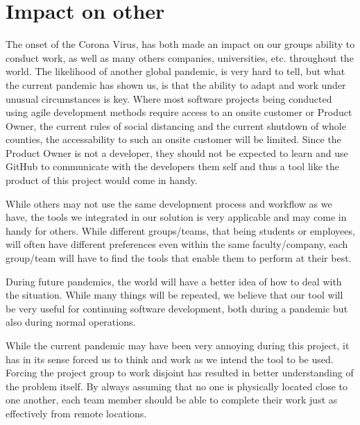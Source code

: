 \section{Impact on other}

The onset of the Corona Virus, has both made an impact on our groups ability to conduct work, as well as many others companies, universities, etc. throughout the world.
The likelihood of another global pandemic, is very hard to tell, but what the current pandemic has shown us, is that the ability to adapt and work under unusual circumstances is key.
Where most software projects being conducted using agile development methods require access to an onsite customer or Product Owner, the current rules of social distancing and the current shutdown of whole counties, the accessability to such an onsite customer will be limited.
Since the Product Owner is not a developer, they should not be expected to learn and use GitHub to communicate with the developers them self and thus a tool like the product of this project would come in handy.

While others may not use the same development process and workflow as we have, the tools we integrated in our solution is very applicable and may come in handy for others.
While different groups/teams, that being students or employees, will often have different preferences even within the same faculty/company, each group/team will have to find the tools that enable them to perform at their best.

During future pandemics, the world will have a better idea of how to deal with the situation.
While many things will be repeated, we believe that our tool will be very useful for continuing software development, both during a pandemic but also during normal operations.

While the current pandemic may have been very annoying during this project, it has in its sense forced us to think and work as we intend the tool to be used.
Forcing the project group to work disjoint has resulted in better understanding of the problem itself.
By always assuming that no one is physically located close to one another, each team member should be able to complete their work just as effectively from remote locations.
